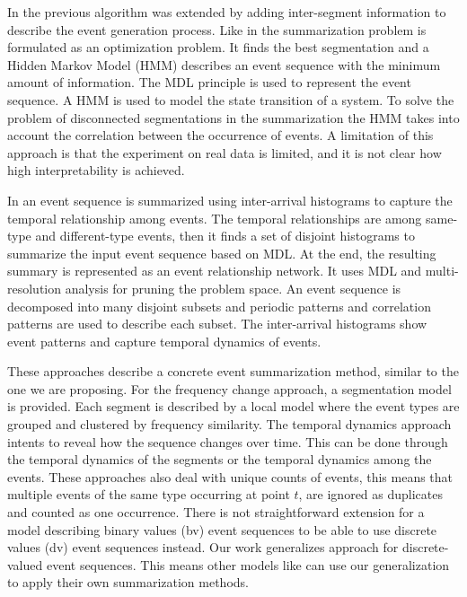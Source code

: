 In \cite{wang:algo} the previous algorithm was extended by adding inter-segment information to describe the event generation process. Like in \cite{Kiernan:constructing} the summarization problem is formulated as an optimization problem. It finds the best segmentation and a Hidden Markov Model (HMM) describes an event sequence with the minimum amount of information. The MDL principle is used to represent the event sequence. A HMM is used to model the state transition of a system. To solve the problem of disconnected segmentations in the summarization the HMM takes into account the correlation between the occurrence of events. A limitation of this approach is that the experiment on real data is limited, and it is not clear how high interpretability is achieved. 

In \cite{jiang:natural} an event sequence is summarized using inter-arrival histograms to capture the temporal relationship among events. The temporal relationships are among same-type and different-type events, then it finds a set of disjoint histograms to summarize the input event sequence based on MDL. At the end, the resulting summary is represented as an event relationship network. It uses MDL and multi-resolution analysis for pruning the problem space. An event sequence is decomposed into many disjoint subsets and periodic patterns and correlation patterns are used to describe each subset. The inter-arrival histograms show event patterns and capture temporal dynamics of events.



These approaches \cite{Kiernan:constructing,wang:algo,jiang:natural} describe a concrete event summarization method, similar to the one we are proposing. For the frequency change approach, a segmentation model is provided. Each segment is described by a local model where the event types are grouped and clustered by frequency similarity. The temporal dynamics approach intents to reveal how the sequence changes over time. This can be done through the temporal dynamics of the segments or the temporal dynamics among the events. These approaches also deal with unique counts of events, this means that multiple events of the same type occurring at point $t$, are ignored as duplicates and counted as one occurrence. There is not straightforward extension for a model describing binary values (bv) event sequences to be able to use discrete values (dv) event sequences instead. Our work generalizes \cite{Kiernan:constructing} approach for discrete-valued event sequences. This means other models like \cite{wang:algo,jiang:natural}  can use our generalization to apply their own summarization methods. 

